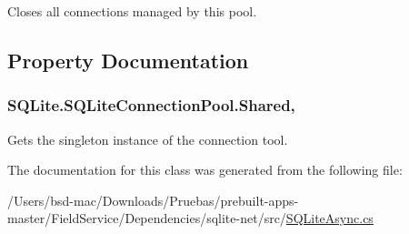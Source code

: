 Closes all connections managed by this pool. 



\subsection{Property Documentation}
\hypertarget{class_s_q_lite_1_1_s_q_lite_connection_pool_aaa23c37a087e3e04c4af6a69ce7cfb97}{
\subsubsection[{Shared}]{ S\+Q\+Lite.\+S\+Q\+Lite\+Connection\+Pool.\+Shared\hspace{0.3cm}{\ttfamily [static]}, {\ttfamily [get]}}}\label{class_s_q_lite_1_1_s_q_lite_connection_pool_aaa23c37a087e3e04c4af6a69ce7cfb97}


Gets the singleton instance of the connection tool. 



The documentation for this class was generated from the following file\+:\begin{DoxyCompactItemize}
\item 
/\+Users/bsd-\/mac/\+Downloads/\+Pruebas/prebuilt-\/apps-\/master/\+Field\+Service/\+Dependencies/sqlite-\/net/src/\hyperlink{_s_q_lite_async_8cs}{S\+Q\+Lite\+Async.\+cs}\end{DoxyCompactItemize}
